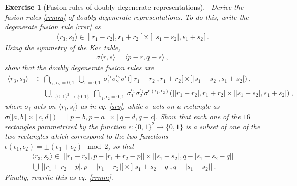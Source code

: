 \documentclass[12pt, a4paper, notitlepage, twoside]{report}
\numberwithin{equation}{section}
\theoremstyle{break}
\newtheorem{exo}{Exercise}[chapter]
\begin{document}
\begin{exo}[Fusion rules of doubly degenerate representations]
 ~\label{exofus}
Derive the fusion rules \eqref{rrmm} of doubly degenerate representations.
To do this, write the degenerate fusion rule \eqref{rrsr} as 
\begin{align}
\langle r_3, s_3\rangle\in\ ]|r_1-r_2|,r_1+r_2[ \times ]|s_1-s_2|,s_1+s_2[ \ .
\end{align}
Using the symmetry of the Kac table,
\begin{align}
 \sigma\langle r,s \rangle = \langle p-r,q-s\rangle\ ,
\label{srs}
\end{align}
show that the doubly degenerate fusion rules are
\begin{align}
\langle r_3, s_3\rangle& \in \bigcap_{\epsilon_1,\epsilon_2 = 0,1}\ \bigcup_{\epsilon=0,1} \ \sigma_1^{\epsilon_1} \sigma_2^{\epsilon_2} \sigma^{\epsilon}
\Big( \big]|r_1-r_2|,r_1+r_2\big[ \times \big]|s_1-s_2|,s_1+s_2\big[  \Big)\ ,
\\
& = \bigcup_{\epsilon:\{0,1\}^2 \to \{0,1\} }\ \bigcap_{\epsilon_1,\epsilon_2=0,1} \ \sigma_1^{\epsilon_1} \sigma_2^{\epsilon_2} \sigma^{\epsilon(\epsilon_1,\epsilon_2)} \Big( \big]|r_1-r_2|,r_1+r_2\big[ \times \big]|s_1-s_2|,s_1+s_2\big[  \Big)\ ,
\end{align}
where $\sigma_i$ acts on $\langle r_i,s_i\rangle$ as in eq. \eqref{srs}, while $\sigma$ acts on a rectangle as $\sigma\big(]a,b[\times]c,d[\big) = ]p-b,p-a[\times ]q-d,q-c[$.
Show that each one of the $16$ rectangles parametrized by the function $\epsilon:\{0,1\}^2 \to \{0,1\} $ is a subset of one of the two rectangles which correspond to the two functions $\epsilon(\epsilon_1,\epsilon_2)=\pm (\epsilon_1+\epsilon_2) \mod 2$, so that 
\begin{multline}
 \langle r_3, s_3\rangle  \in\  \big]|r_1-r_2|,p-|r_1+r_2-p|\big[\times \big]|s_1-s_2|,q-|s_1+s_2-q|\big[ 
\\
 \bigcup\ \big]|r_1+r_2-p|,p-|r_1-r_2|\big[\times \big]|s_1+s_2-q|,q-|s_1-s_2|\big[\ .
\end{multline}
Finally, rewrite this as eq. \eqref{rrmm}.
\end{exo}
\end{document}
